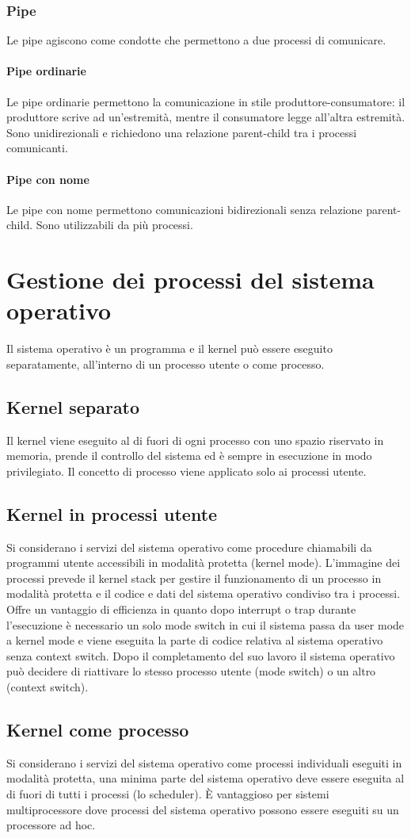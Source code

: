 \subsubsection{Pipe}
Le pipe agiscono come condotte che permettono a due processi di comunicare.
\paragraph{Pipe ordinarie}
Le pipe ordinarie permettono la comunicazione in stile produttore-consumatore: il produttore scrive ad un'estremit\`a, mentre il consumatore legge all'altra estremit\`a. Sono 
unidirezionali e richiedono una relazione parent-child tra i processi comunicanti. 
\paragraph{Pipe con nome}
Le pipe con nome permettono comunicazioni bidirezionali senza relazione parent-child. Sono utilizzabili da pi\`u processi. 
\section{Gestione dei processi del sistema operativo}
Il sistema operativo \`e un programma e il kernel pu\`o essere eseguito separatamente, all'interno di un processo utente o come processo. 
\subsection{Kernel separato}
Il kernel viene eseguito al di fuori di ogni processo con uno spazio riservato in memoria, prende il controllo del sistema ed \`e sempre in esecuzione in modo privilegiato. Il concetto
di processo viene applicato solo ai processi utente.
\subsection{Kernel in processi utente}
Si considerano i servizi del sistema operativo come procedure chiamabili da programmi utente accessibili in modalit\`a protetta (kernel mode). L'immagine dei processi prevede il 
kernel stack per gestire il funzionamento di un processo in modalit\`a protetta e il codice e dati del sistema operativo condiviso tra i processi. Offre un vantaggio di efficienza in
quanto dopo interrupt o trap durante l'esecuzione \`e necessario un solo mode switch in cui il sistema passa da user mode a kernel mode e viene eseguita la parte di codice relativa al
sistema operativo senza context switch. Dopo il completamento del suo lavoro il sistema operativo pu\`o decidere di riattivare lo stesso processo utente (mode switch) o un altro 
(context switch). 
\subsection{Kernel come processo}
Si considerano i servizi del sistema operativo come processi individuali eseguiti in modalit\`a protetta, una minima parte del sistema operativo deve essere eseguita al di fuori di
tutti i processi (lo scheduler). \`E vantaggioso per sistemi multiprocessore dove processi del sistema operativo possono essere eseguiti su un processore ad hoc. 
